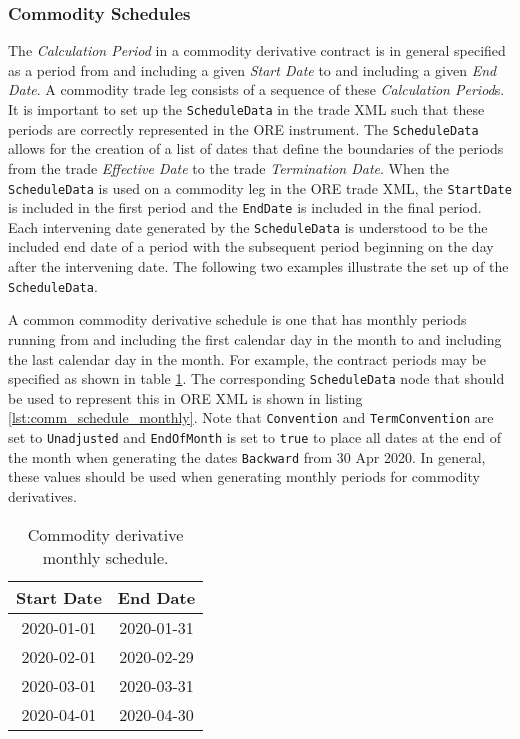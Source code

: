 \subsubsection{Commodity Schedules}
\label{ss:commodity_schedules}
The \textit{Calculation Period} in a commodity derivative contract is in general specified as a period from and including a given \textit{Start Date} to and including a given \textit{End Date}. A commodity trade leg consists of a sequence of these \textit{Calculation Period}s. It is important to set up the \lstinline!ScheduleData! in the trade XML such that these periods are correctly represented in the ORE instrument. The \lstinline!ScheduleData! allows for the creation of a list of dates that define the boundaries of the periods from the trade \textit{Effective Date} to the trade \textit{Termination Date}. When the \lstinline!ScheduleData! is used on a commodity leg in the ORE trade XML, the \lstinline!StartDate! is included in the first period and the \lstinline!EndDate! is included in the final period. Each intervening date generated by the \lstinline!ScheduleData! is understood to be the included end date of a period with the subsequent period beginning on the day after the intervening date. The following two examples illustrate the set up of the \lstinline!ScheduleData!.

A common commodity derivative schedule is one that has monthly periods running from and including the first calendar day in the month to and including the last calendar day in the month. For example, the contract periods may be specified as shown in table \ref{tab:comm_schedule_monthly}. The corresponding \lstinline!ScheduleData! node that should be used to represent this in ORE XML is shown in listing \ref{lst:comm_schedule_monthly}. Note that \lstinline!Convention! and \lstinline!TermConvention! are set to \lstinline!Unadjusted! and \lstinline!EndOfMonth! is set to \lstinline!true! to place all dates at the end of the month when generating the dates \lstinline!Backward! from 30 Apr 2020. In general, these values should be used when generating monthly periods for commodity derivatives.

\begin{table}[h!]
\centering
  \begin{tabular}{|c|c|}
  \hline
  Start Date & End Date \\
  \hline
  2020-01-01 & 2020-01-31 \\
  2020-02-01 & 2020-02-29 \\
  2020-03-01 & 2020-03-31 \\
  2020-04-01 & 2020-04-30 \\
  \hline
  \end{tabular}
\caption{Commodity derivative monthly schedule.}
\label{tab:comm_schedule_monthly}
\end{table}

